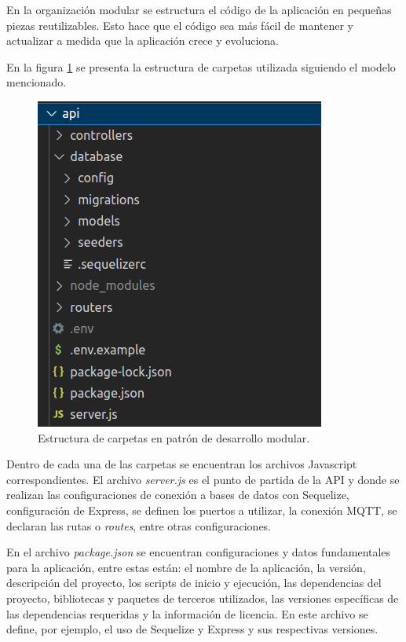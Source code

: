 En la organización modular se estructura el código de la aplicación en pequeñas piezas reutilizables. Esto hace que el código sea más fácil de mantener y actualizar a medida que la aplicación crece y evoluciona.

En la figura \ref{fig:apiestructura} se presenta la estructura de carpetas utilizada siguiendo el modelo mencionado. 

\begin{figure}[ht]
	\centering
	\includegraphics[scale=.50]{./Figures/api-estructura-archivos.png}
	\caption{Estructura de carpetas en patrón de desarrollo modular.}
	\label{fig:apiestructura}
\end{figure}

Dentro de cada una de las carpetas se encuentran los archivos Javascript correspondientes. El archivo \textit{server.js} es el punto de partida de la API y donde se realizan las configuraciones de conexión a bases de datos con Sequelize, configuración de Express, se definen los puertos a utilizar, la conexión MQTT, se declaran las rutas o \textit{routes}, entre otras configuraciones.

En el archivo \textit{package.json} se encuentran configuraciones y datos fundamentales para la aplicación, entre estas están: el nombre de la aplicación, la versión, descripción del proyecto, los scripts de inicio y ejecución, las dependencias del proyecto, bibliotecas y paquetes de terceros utilizados, las versiones específicas de las dependencias requeridas y la información de licencia. En este archivo se define, por ejemplo, el uso de Sequelize y Express y sus respectivas versiones.

